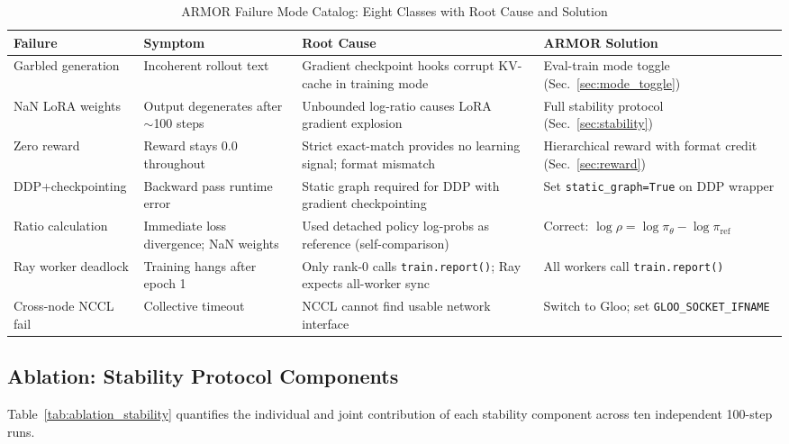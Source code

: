 \documentclass{ieeeaccess}
\begin{document}
\begin{table}[t]
\centering
\caption{ARMOR Failure Mode Catalog: Eight Classes with Root Cause and Solution}
\label{tab:failure_modes}
\begin{tabular}{p{2.6cm}p{3.4cm}p{3.6cm}p{4.6cm}}
\toprule
\textbf{Failure} & \textbf{Symptom} & \textbf{Root Cause} & \textbf{ARMOR Solution} \\
\midrule
Garbled generation & Incoherent rollout text & Gradient checkpoint hooks corrupt KV-cache in training mode & Eval-train mode toggle (Sec.~\ref{sec:mode_toggle}) \\
\midrule
NaN LoRA weights & Output degenerates after $\sim$100 steps & Unbounded log-ratio causes LoRA gradient explosion & Full stability protocol (Sec.~\ref{sec:stability}) \\
\midrule
Zero reward & Reward stays 0.0 throughout & Strict exact-match provides no learning signal; format mismatch & Hierarchical reward with format credit (Sec.~\ref{sec:reward}) \\
\midrule
DDP+checkpointing & Backward pass runtime error & Static graph required for DDP with gradient checkpointing & Set \texttt{static\_graph=True} on DDP wrapper \\
\midrule
Ratio calculation & Immediate loss divergence; NaN weights & Used detached policy log-probs as reference (self-comparison) & Correct: $\log\rho=\log\pi_\theta - \log\pi_{\mathrm{ref}}$ \\
\midrule
Ray worker deadlock & Training hangs after epoch 1 & Only rank-0 calls \texttt{train.report()}; Ray expects all-worker sync & All workers call \texttt{train.report()} \\
\midrule
Cross-node NCCL fail & Collective timeout & NCCL cannot find usable network interface & Switch to Gloo; set \texttt{GLOO\_SOCKET\_IFNAME} \\
\bottomrule
\end{tabular}
\end{table}

\subsection{Ablation: Stability Protocol Components}

Table~\ref{tab:ablation_stability} quantifies the individual and joint contribution
of each stability component across ten independent 100-step runs.
\end{document}
